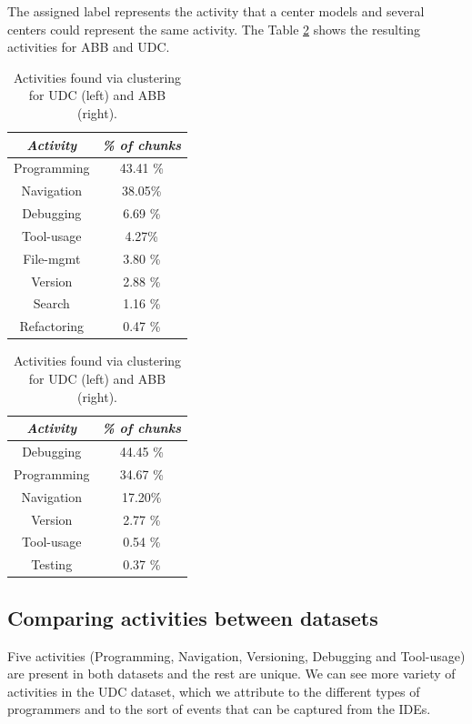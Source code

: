 The assigned label represents the activity that a center models and several centers could represent the same activity. The Table \ref{tbl:activities} shows the resulting activities for ABB and UDC.

\begin{table}
	\caption{Activities found via clustering for UDC (left) and ABB (right).}
	\label{tbl:activities}
	\centering
	\begin{tabular}{c | c }
		\hline 
		\emph{Activity} & \emph{\% of chunks}\\  
		\hline 
		\hline
		Programming & 43.41 \% \\
		\hline
		Navigation & 38.05\%\\
		\hline
		Debugging & 6.69 \% \\
		\hline	
		Tool-usage & 4.27\% \\
		\hline
		File-mgmt & 3.80 \% \\
		\hline 		
		Version & 2.88 \%\\
		\hline
		Search & 1.16 \% \\
		\hline
		Refactoring & 0.47 \% \\
		\hline
		
	\end{tabular}
	\quad
	\begin{tabular}{c | c }
		\hline 
		\emph{Activity} & \emph{\% of chunks}\\  
		\hline 
		\hline 
		Debugging & 44.45 \% \\
		\hline
		Programming & 34.67 \% \\
		\hline
		Navigation & 17.20\%\\
		\hline
		Version & 2.77 \%\\
		\hline
		Tool-usage & 0.54 \% \\
		\hline
		Testing & 0.37	 \% \\
		\hline
	\end{tabular}
\end{table}

\subsection{Comparing activities between datasets}

Five activities (Programming, Navigation, Versioning, Debugging and Tool-usage) are present in both datasets and the rest are unique. We can see more variety of activities in the UDC dataset, which we attribute to the different types of programmers and to the sort of events that can be captured from the IDEs.

